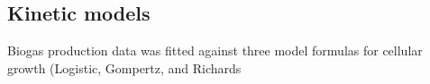 \subsection{Kinetic models}
Biogas production data was fitted against three model formulas for cellular growth (Logistic, Gompertz, and
Richards 
